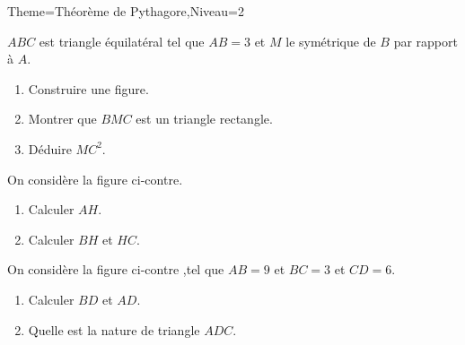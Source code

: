 \documentclass[a4paper,12pt]{article}
\begin{document}
\begin{Maquette}[Fiche]{Theme=Théorème de Pythagore,Niveau=2}
\begin{exercice}
$ABC$ est triangle équilatéral tel que $AB=3$ et $M$ le symétrique de $B$ par rapport à $A$.
\begin{enumerate}
\item Construire une figure.
\item Montrer que $BMC$ est un triangle rectangle.
\item Déduire $MC^{2}$.
\end{enumerate}
\end{exercice}

\begin{exercice}
\begin{minipage}{0.5\linewidth}
On considère la figure ci-contre.
\begin{enumerate}
\item Calculer $AH$.
\item Calculer $BH$ et $HC$.
\end{enumerate}
\end{minipage}%
\begin{minipage}{0.5\linewidth}
\end{minipage}
\end{exercice}

\begin{exercice}
\begin{minipage}{0.5\linewidth}
On considère la figure ci-contre ,tel que $AB=9$ et $BC=3$ et $CD=6$.
\begin{enumerate}
\item Calculer $BD$ et $AD$.
\item Quelle est la nature de triangle $ADC$.
\end{enumerate}
\end{minipage}%
\begin{minipage}{0.5\linewidth}
\end{minipage}
\end{exercice}


\end{Maquette}
\end{document}
